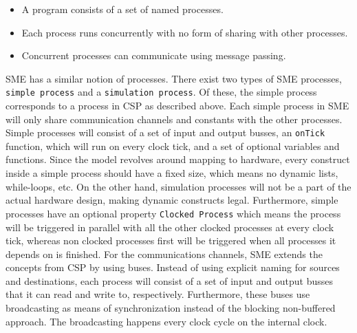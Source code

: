 \documentclass[a4paper]{article}
\begin{document}
\begin{itemize}
\item A program consists of a set of named processes.
\item Each process runs concurrently with no form of sharing with other processes.
\item Concurrent processes can communicate using message passing.
\end{itemize}

SME has a similar notion of processes. There exist two types of SME processes, \texttt{simple process} and a \texttt{simulation process}. Of these, the simple process corresponds to a process in CSP as described above. Each simple process in SME will only share communication channels and constants with the other processes. Simple processes will consist of a set of input and output busses, an \texttt{onTick} function, which will run on every clock tick, and a set of optional variables and functions. Since the model revolves around mapping to hardware, every construct inside a simple process should have a fixed size, which means no dynamic lists, while-loops, etc. On the other hand, simulation processes will not be a part of the actual hardware design, making dynamic constructs legal. Furthermore, simple processes have an optional property \texttt{Clocked Process} which means the process will be triggered in parallel with all the other clocked processes at every clock tick, whereas non clocked processes first will be triggered when all processes it depends on is finished.
For the communications channels, SME extends the concepts from CSP by using buses. Instead of using explicit naming for sources and destinations, each process will consist of a set of input and output busses that it can read and write to, respectively. Furthermore, these buses use broadcasting as means of synchronization instead of the blocking non-buffered approach.  The broadcasting happens every clock cycle on the internal clock.
\end{document}
